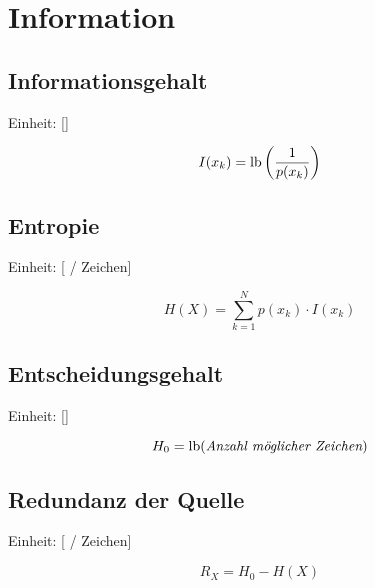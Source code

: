 \section{Information}


\subsection{Informationsgehalt}

Einheit: [\si{\bit}]

$$I(x_k) = \operatorname{lb}\left(\frac{1}{p(x_k)}\right)$$


\subsection{Entropie}

Einheit: [\si{\bit} / Zeichen]

$$H(X) = \sum_{k=1}^N p(x_k) \cdot I(x_k)$$


\subsection{Entscheidungsgehalt}

Einheit: [\si{\bit}]

$$H_0 = \operatorname{lb}(\textit{Anzahl möglicher Zeichen})$$


\subsection{Redundanz der Quelle}

Einheit: [\si{\bit} / Zeichen]

$$R_X = H_0 - H(X)$$
